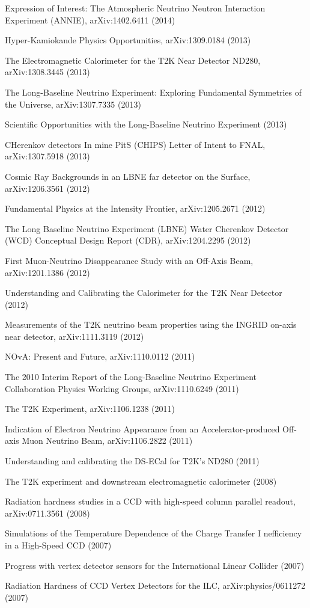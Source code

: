 \begin{list2}
\item Expression of Interest: The Atmospheric Neutrino Neutron Interaction Experiment (ANNIE), arXiv:1402.6411 (2014) %
\item Hyper-Kamiokande Physics Opportunities, arXiv:1309.0184 (2013) %
\item The Electromagnetic Calorimeter for the T2K Near Detector ND280, arXiv:1308.3445 (2013) %
\item The Long-Baseline Neutrino Experiment: Exploring Fundamental Symmetries of the Universe, arXiv:1307.7335 (2013) %
\item Scientific Opportunities with the Long-Baseline Neutrino Experiment (2013) %
\item CHerenkov detectors In mine PitS (CHIPS) Letter of Intent to FNAL, arXiv:1307.5918 (2013) %
\item Cosmic Ray Backgrounds in an LBNE far detector on the Surface, arXiv:1206.3561 (2012) %
\item Fundamental Physics at the Intensity Frontier, arXiv:1205.2671 (2012) %
\item The Long Baseline Neutrino Experiment (LBNE) Water Cherenkov Detector (WCD) Conceptual Design Report (CDR), arXiv:1204.2295 (2012) %
\item First Muon-Neutrino Disappearance Study with an Off-Axis Beam, arXiv:1201.1386 (2012) %
\item Understanding and Calibrating the Calorimeter for the T2K Near Detector (2012) %
\item Measurements of the T2K neutrino beam properties using the INGRID on-axis near detector, arXiv:1111.3119 (2012) %
\item NOvA: Present and Future, arXiv:1110.0112 (2011) %
\item The 2010 Interim Report of the Long-Baseline Neutrino Experiment Collaboration Physics Working Groups, arXiv:1110.6249 (2011) %
\item The T2K Experiment, arXiv:1106.1238 (2011) %
\item Indication of Electron Neutrino Appearance from an Accelerator-produced Off-axis Muon Neutrino Beam, arXiv:1106.2822 (2011) %
\item Understanding and calibrating the DS-ECal for T2K's ND280 (2011) %
\item The T2K experiment and downstream electromagnetic calorimeter (2008) %
\item Radiation hardness studies in a CCD with high-speed column parallel readout, arXiv:0711.3561 (2008) %
\item Simulations of the Temperature Dependence of the Charge Transfer I nefficiency in a High-Speed CCD (2007) %
\item Progress with vertex detector sensors for the International Linear Collider (2007) %
\item Radiation Hardness of CCD Vertex Detectors for the ILC, arXiv:physics/0611272 (2007) %
\end{list2}

